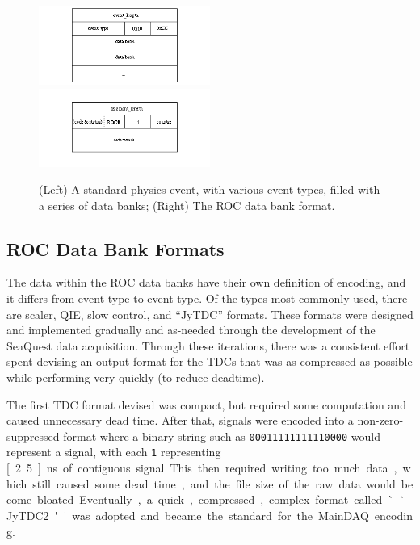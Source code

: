 \begin{figure}
	\centerline{
		\mbox{\includegraphics[width=0.5\textwidth]{figures/production/physics_event.png} \includegraphics[width=0.5\textwidth]{figures/production/roc_event.png}}
	}
	\caption{(Left) A standard physics event, with various event types, filled with a series of data banks; (Right) The ROC data bank format\cite{jlab:coda}.}
	\label{fig:coda-physics-roc}
\end{figure}

\subsection{ROC Data Bank Formats}

The data within the ROC data banks have their own definition of encoding, and it differs from event type to event type. Of the types most commonly used, there are scaler, QIE, slow control, and ``JyTDC'' formats. These formats were designed and implemented gradually and as-needed through the development of the SeaQuest data acquisition. Through these iterations, there was a consistent effort spent devising an output format for the TDCs that was as compressed as possible while performing very quickly (to reduce deadtime). 

The first TDC format devised was compact, but required some computation and caused unnecessary dead time. After that, signals were encoded into a non-zero-suppressed format where a binary string such as \verb|00011111111110000| would represent a signal, with each \verb|1| representing \unit[2.5]{ns} of contiguous signal. This then required writing too much data, which still caused some dead time, and the file size of the raw data would become bloated. Eventually, a quick, compressed, complex format called ``JyTDC2'' was adopted and became the standard for the MainDAQ encoding.

